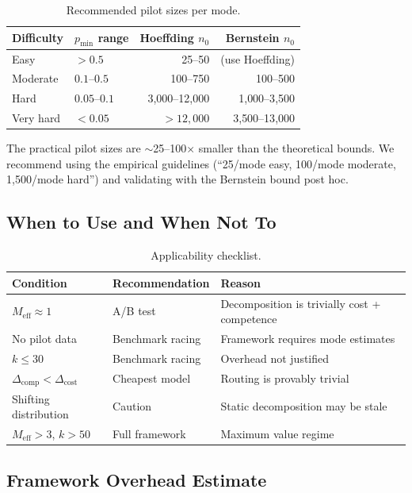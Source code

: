 \documentclass[twoside,11pt]{article}
\newcommand{\Meff}{M_{\mathrm{eff}}}
\newcommand{\pmin}{p_{\min}}
\begin{document}
\begin{table}[h]
\centering
\caption{Recommended pilot sizes per mode.}
\label{tab:pilot-sizing}
\begin{tabular}{llrr}
\toprule
Difficulty & $\pmin$ range & Hoeffding $n_0$ & Bernstein $n_0$ \\
\midrule
Easy & $> 0.5$ & 25--50 & (use Hoeffding) \\
Moderate & $0.1$--$0.5$ & 100--750 & 100--500 \\
Hard & $0.05$--$0.1$ & 3{,}000--12{,}000 & 1{,}000--3{,}500 \\
Very hard & $< 0.05$ & $> 12{,}000$ & 3{,}500--13{,}000 \\
\bottomrule
\end{tabular}
\end{table}

The practical pilot sizes are $\sim$25--100$\times$ smaller than the theoretical bounds.
We recommend using the empirical guidelines (``25/mode easy, 100/mode moderate, 1{,}500/mode hard'') and validating with the Bernstein bound post hoc.

\subsection{When to Use and When Not To}

\begin{table}[h]
\centering
\caption{Applicability checklist.}
\label{tab:applicability}
\begin{tabular}{lll}
\toprule
Condition & Recommendation & Reason \\
\midrule
$\Meff \approx 1$ & A/B test & Decomposition is trivially cost + competence \\
No pilot data & Benchmark racing & Framework requires mode estimates \\
$k \le 30$ & Benchmark racing & Overhead not justified \\
$\Delta_{\mathrm{comp}} < \Delta_{\mathrm{cost}}$ & Cheapest model & Routing is provably trivial \\
Shifting distribution & Caution & Static decomposition may be stale \\
$\Meff > 3$, $k > 50$ & Full framework & Maximum value regime \\
\bottomrule
\end{tabular}
\end{table}

\subsection{Framework Overhead Estimate}
\end{document}
